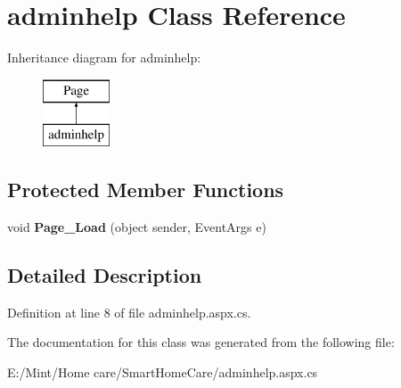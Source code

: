 \hypertarget{classadminhelp}{\section{adminhelp Class Reference}
\label{classadminhelp}
}
Inheritance diagram for adminhelp\-:\begin{figure}[H]
\begin{center}
\leavevmode
\includegraphics[height=2.000000cm]{classadminhelp}
\end{center}
\end{figure}
\subsection*{Protected Member Functions}
\begin{DoxyCompactItemize}
\item 
\hypertarget{classadminhelp_ae9508db86c07922a53c4f3f46e7ab27e}{void {\bfseries Page\-\_\-\-Load} (object sender, Event\-Args e)}\label{classadminhelp_ae9508db86c07922a53c4f3f46e7ab27e}

\end{DoxyCompactItemize}


\subsection{Detailed Description}


Definition at line 8 of file adminhelp.\-aspx.\-cs.



The documentation for this class was generated from the following file\-:\begin{DoxyCompactItemize}
\item 
E\-:/\-Mint/\-Home care/\-Smart\-Home\-Care/adminhelp.\-aspx.\-cs\end{DoxyCompactItemize}
